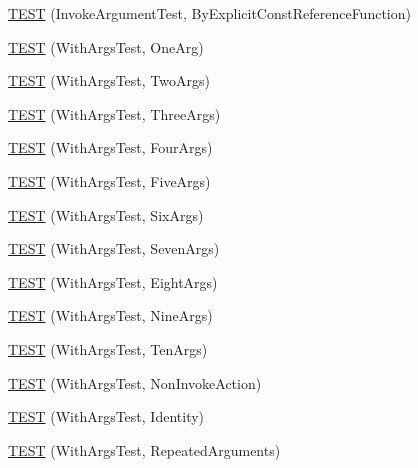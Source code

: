 \begin{DoxyCompactItemize}
\item 
\hyperlink{namespacetesting_1_1gmock__generated__actions__test_accb544431629bfb38a618343daaa54c2}{T\+E\+ST} (Invoke\+Argument\+Test, By\+Explicit\+Const\+Reference\+Function)
\item 
\hyperlink{namespacetesting_1_1gmock__generated__actions__test_ae6ef9e9d09c01cd0699a3044fd8c3f1f}{T\+E\+ST} (With\+Args\+Test, One\+Arg)
\item 
\hyperlink{namespacetesting_1_1gmock__generated__actions__test_afadf90d2d0acc55906bfd7f0f43f8a04}{T\+E\+ST} (With\+Args\+Test, Two\+Args)
\item 
\hyperlink{namespacetesting_1_1gmock__generated__actions__test_acae0920fc83b3990663b9d448b8bfd9a}{T\+E\+ST} (With\+Args\+Test, Three\+Args)
\item 
\hyperlink{namespacetesting_1_1gmock__generated__actions__test_ab7046e566f75756b6fe1ec4d92ff7c2b}{T\+E\+ST} (With\+Args\+Test, Four\+Args)
\item 
\hyperlink{namespacetesting_1_1gmock__generated__actions__test_ab51a43ea1c760e001330400d6cec5bfc}{T\+E\+ST} (With\+Args\+Test, Five\+Args)
\item 
\hyperlink{namespacetesting_1_1gmock__generated__actions__test_a167731ec11d5cf4135d95b01dc59e223}{T\+E\+ST} (With\+Args\+Test, Six\+Args)
\item 
\hyperlink{namespacetesting_1_1gmock__generated__actions__test_a04970f4db4de11d91e59ae8769dccea1}{T\+E\+ST} (With\+Args\+Test, Seven\+Args)
\item 
\hyperlink{namespacetesting_1_1gmock__generated__actions__test_a5cbb36915cb29391752600a2a0e9c7e1}{T\+E\+ST} (With\+Args\+Test, Eight\+Args)
\item 
\hyperlink{namespacetesting_1_1gmock__generated__actions__test_aee9acec4535339649dd3067f671cc6c1}{T\+E\+ST} (With\+Args\+Test, Nine\+Args)
\item 
\hyperlink{namespacetesting_1_1gmock__generated__actions__test_a6a818f5a6c2250d3944f90e4331ebc0e}{T\+E\+ST} (With\+Args\+Test, Ten\+Args)
\item 
\hyperlink{namespacetesting_1_1gmock__generated__actions__test_a5380c41df40cb159d58d4c4c81aeac19}{T\+E\+ST} (With\+Args\+Test, Non\+Invoke\+Action)
\item 
\hyperlink{namespacetesting_1_1gmock__generated__actions__test_a0499d0970300d8d6c252a898222b8dd3}{T\+E\+ST} (With\+Args\+Test, Identity)
\item 
\hyperlink{namespacetesting_1_1gmock__generated__actions__test_aea7114a30b1fc589d14e84f1a27bd1fb}{T\+E\+ST} (With\+Args\+Test, Repeated\+Arguments)

\end{DoxyCompactItemize}
